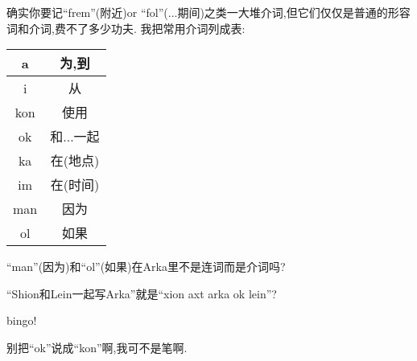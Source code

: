 确实你要记``frem''(附近)or ``fol''(...期间)之类一大堆介词,但它们仅仅是普通的形容词和介词,费不了多少功夫.
我把常用介词列成表:
\begin{table}[H]
    \begin{tabular}{|c|c|} %
    \hline
	a&  	为,到 \\\hline
  	i&  	从 \\\hline
  	kon&  	使用 \\\hline
 	ok&  	和...一起 \\\hline
	ka&  	在(地点) \\\hline
	im&  	在(时间) \\\hline
	man&  	因为 \\\hline
	ol&  	如果 \\\hline
	\end{tabular}
\end{table}

  
    

``man''(因为)和``ol''(如果)在Arka里不是连词而是介词吗?

``Shion和Lein一起写Arka''就是``xion axt arka ok lein''?


bingo!

别把``ok''说成``kon''啊,我可不是笔啊.





